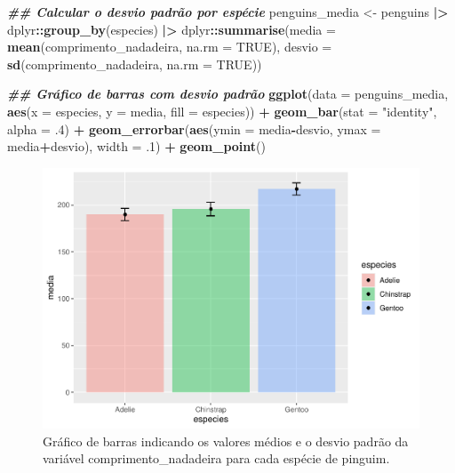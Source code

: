 \documentclass[
]{article}
\newenvironment{Shaded}{\begin{snugshade}}{\end{snugshade}}
\newcommand{\AttributeTok}[1]{\textcolor[rgb]{0.13,0.29,0.53}{#1}}
\newcommand{\ConstantTok}[1]{\textcolor[rgb]{0.56,0.35,0.01}{#1}}
\newcommand{\DecValTok}[1]{\textcolor[rgb]{0.00,0.00,0.81}{#1}}
\newcommand{\DocumentationTok}[1]{\textcolor[rgb]{0.56,0.35,0.01}{\textbf{\textit{#1}}}}
\newcommand{\FunctionTok}[1]{\textcolor[rgb]{0.13,0.29,0.53}{\textbf{#1}}}
\newcommand{\NormalTok}[1]{#1}
\newcommand{\OtherTok}[1]{\textcolor[rgb]{0.56,0.35,0.01}{#1}}
\newcommand{\SpecialCharTok}[1]{\textcolor[rgb]{0.81,0.36,0.00}{\textbf{#1}}}
\newcommand{\StringTok}[1]{\textcolor[rgb]{0.31,0.60,0.02}{#1}}
\begin{document}
\begin{Shaded}
\begin{Highlighting}[]
\DocumentationTok{\#\# Calcular o desvio padrão por espécie}
\NormalTok{penguins\_media }\OtherTok{\textless{}{-}}\NormalTok{ penguins }\SpecialCharTok{|\textgreater{}} 
\NormalTok{    dplyr}\SpecialCharTok{::}\FunctionTok{group\_by}\NormalTok{(especies) }\SpecialCharTok{|\textgreater{}} 
\NormalTok{    dplyr}\SpecialCharTok{::}\FunctionTok{summarise}\NormalTok{(}\AttributeTok{media =} \FunctionTok{mean}\NormalTok{(comprimento\_nadadeira, }\AttributeTok{na.rm =} \ConstantTok{TRUE}\NormalTok{),}
                     \AttributeTok{desvio =} \FunctionTok{sd}\NormalTok{(comprimento\_nadadeira, }\AttributeTok{na.rm =} \ConstantTok{TRUE}\NormalTok{))}

\DocumentationTok{\#\# Gráfico de barras com desvio padrão}
\FunctionTok{ggplot}\NormalTok{(}\AttributeTok{data =}\NormalTok{ penguins\_media, }\FunctionTok{aes}\NormalTok{(}\AttributeTok{x =}\NormalTok{ especies, }\AttributeTok{y =}\NormalTok{ media, }\AttributeTok{fill =}\NormalTok{ especies)) }\SpecialCharTok{+}
    \FunctionTok{geom\_bar}\NormalTok{(}\AttributeTok{stat =} \StringTok{"identity"}\NormalTok{, }\AttributeTok{alpha =}\NormalTok{ .}\DecValTok{4}\NormalTok{) }\SpecialCharTok{+}
    \FunctionTok{geom\_errorbar}\NormalTok{(}\FunctionTok{aes}\NormalTok{(}\AttributeTok{ymin =}\NormalTok{ media}\SpecialCharTok{{-}}\NormalTok{desvio, }\AttributeTok{ymax =}\NormalTok{ media}\SpecialCharTok{+}\NormalTok{desvio), }\AttributeTok{width =}\NormalTok{ .}\DecValTok{1}\NormalTok{) }\SpecialCharTok{+} 
    \FunctionTok{geom\_point}\NormalTok{()}
\end{Highlighting}
\end{Shaded}

\begin{figure}
\includegraphics[width=0.75\linewidth,height=0.75\textheight]{epr_files/figure-latex/fig-bar-species-sd-1} \caption{Gráfico de barras indicando os valores médios e o desvio padrão da variável comprimento_nadadeira para cada espécie de pinguim.}\label{fig:fig-bar-species-sd}
\end{figure}
\end{document}
